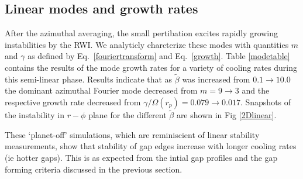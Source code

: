 \subsection{Linear modes and growth rates}\label{linear}
After the azimuthal averaging, the small pertibation excites rapidly growing instabilities by the RWI. We analyticly charcterize these modes with quantities $m$ and $\gamma$ as defined by Eq.~\ref{fouriertransform} and Eq.~\ref{growth}. Table \ref{modetable} contains the results of the mode growth rates for a variety of cooling rates during this semi-linear phase. Results indicate that as $\tilde{\beta}$ was increased from $ 0.1\rightarrow10.0$ the dominant azimuthal Fourier mode decreased from $ m=9\rightarrow3$ and the respective growth rate decreased from $ \gamma/\Omega(r_p)=0.079 \rightarrow 0.017$. Snapshots of the instability in $r-\phi$ plane for the different $\tilde\beta$ are shown in Fig \ref{2Dlinear}.

These `planet-off' simulations, which are reminiscient of linear stability measurements, show that stability of gap edges increase with longer cooling rates (ie hotter gaps). This is as expected from the intial gap profiles and the gap forming criteria discussed in the previous section.


